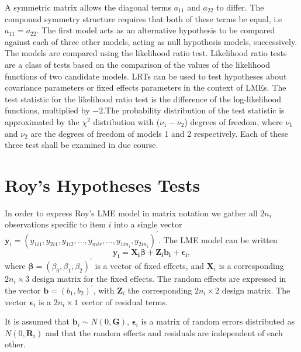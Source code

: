 \documentclass[12pt, a4paper]{article}
\theoremstyle{plain}
\theoremstyle{definition}
\theoremstyle{remark}
\begin{document}
	A symmetric matrix allows the diagonal terms $a_{11}$ and $a_{22}$ to differ. The compound symmetry structure requires that both of these terms be equal, i.e $a_{11} = a_{22}$. The first model acts as an alternative hypothesis to be compared against each of three other models, acting as null hypothesis models, successively. The models are compared using the likelihood ratio test. Likelihood ratio tests are a class of tests based on the comparison of the values of the likelihood functions of two candidate models. LRTs can be used to test hypotheses about covariance parameters or fixed effects parameters in the context of LMEs. The test statistic for the likelihood ratio test is the difference of the log-likelihood functions, multiplied by $-2$.The probability distribution of the test statistic is approximated by the $\chi^2$ distribution with ($\nu_{1} - \nu_{2}$) degrees of freedom, where $\nu_{1}$ and $\nu_{2}$ are the degrees of freedom of models 1 and 2 respectively. Each of these three test shall be examined in due course.

	
	
	
	\newpage
	
	\section{Roy's Hypotheses Tests}

	In order to express Roy's LME model in matrix notation we gather all $2n_i$ observations specific to item $i$ into a single vector  $\boldsymbol{y}_{i} = (y_{1i1},y_{2i1},y_{1i2},\ldots,y_{mir},\ldots,y_{1in_{i}},y_{2in_{i}})^\prime.$ The LME model can be written
	\[
	\boldsymbol{y_{i}} = \boldsymbol{X_{i}\beta} + \boldsymbol{Z_{i}b_{i}} + \boldsymbol{\epsilon_{i}},
	\]
	where $\boldsymbol{\beta}=(\beta_0,\beta_1,\beta_2)^\prime$ is a vector of fixed effects, and $\boldsymbol{X}_i$ is a corresponding $2n_i\times 3$ design matrix for the fixed effects. The random effects are expressed in the vector $\boldsymbol{b}=(b_1,b_2)^\prime$, with $\boldsymbol{Z}_i$ the corresponding $2n_i\times 2$ design matrix. The vector $\boldsymbol{\epsilon}_i$ is a $2n_i\times 1$ vector of residual terms.
	
	It is assumed that $\boldsymbol{b}_i \sim N(0,\boldsymbol{G})$, $\boldsymbol{\epsilon}_i$ is a matrix of random errors distributed as $N(0,\boldsymbol{R}_i)$ and that the random effects and residuals are independent of each other.
	
\end{document}
